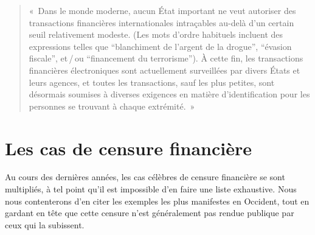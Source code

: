 \begin{quote}
«~Dans le monde moderne, aucun État important ne veut autoriser des transactions financières internationales intraçables au-delà d'un certain seuil relativement modeste. (Les mots d'ordre habituels incluent des expressions telles que “blanchiment de l'argent de la drogue”, “évasion fiscale”, et\,/\,ou “financement du terrorisme”). À cette fin, les transactions financières électroniques sont actuellement surveillées par divers États et leurs agences, et toutes les transactions, sauf les plus petites, sont désormais soumises à diverses exigences en matière d'identification pour les personnes se trouvant à chaque extrémité.~»
\end{quote} %

\section*{Les cas de censure financière}


Au cours des dernières années, les cas célèbres de censure financière se sont multipliés, à tel point qu'il est impossible d'en faire une liste exhaustive. Nous nous contenterons d'en citer les exemples les plus manifestes en Occident, tout en gardant en tête que cette censure n'est généralement pas rendue publique par ceux qui la subissent.

